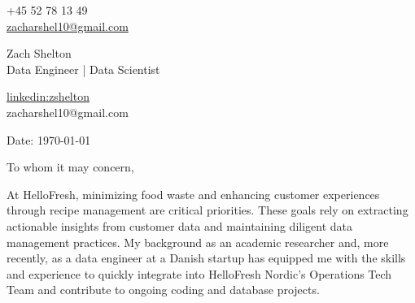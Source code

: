 \documentclass[11pt,a4]{article}
\begin{document}
\begin{center}
    \begin{minipage}[b]{0.24\textwidth}
            \large +45 52 78 13 49 \\
            \large \href{mailto:zacharshel10@gmail.com}{zacharshel10@gmail.com} 
    \end{minipage}%
    \begin{minipage}[b]{0.5\textwidth}
            \centering
            {\Huge Zach Shelton} \\ %
            \vspace{0.1cm}
            {\color{UI_blue} \Large{Data Engineer | Data Scientist}} \\
    \end{minipage}%
    \begin{minipage}[b]{0.24\textwidth}
            \flushright \large
            {\href{https://www.linkedin.com/in/zshelton/}{linkedin:zshelton} } \\
            zacharshel10@gmail.com
    \end{minipage}   
    
\vspace{-0.15cm} 
{\color{UI_blue} \hrulefill}
\end{center}

\justify
\setlength{\parindent}{0pt}
\setlength{\parskip}{12pt}
\vspace{0.1cm}


Date: \today \par \vspace{-0.1cm}

To whom it may concern,

At HelloFresh, minimizing food waste and enhancing customer experiences through recipe management are critical priorities. These goals rely on extracting actionable insights from customer data and maintaining diligent data management practices. My background as an academic researcher and, more recently, as a data engineer at a Danish startup has equipped me with the skills and experience to quickly integrate into HelloFresh Nordic's Operations Tech Team and contribute to ongoing coding and database projects.
\end{document}
